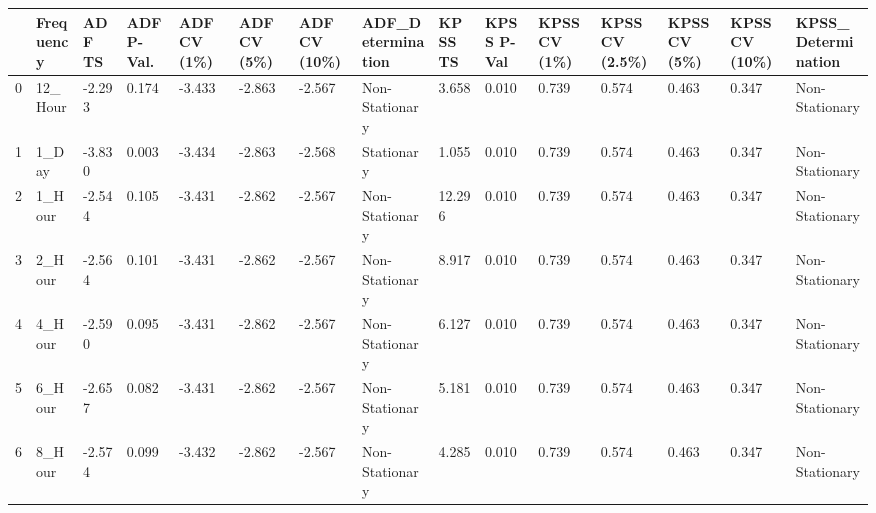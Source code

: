 \begin{tabular}{lllllllllllllll}
\toprule
 & Frequency & ADF TS & ADF P-Val. & ADF CV (1\%) & ADF CV (5\%) & ADF CV (10\%) & ADF_Determination & KPSS TS & KPSS P-Val & KPSS CV (1\%) & KPSS CV (2.5\%) & KPSS CV (5\%) & KPSS CV (10\%) & KPSS_Determination \\
\midrule
0 & 12_Hour & -2.293 & 0.174 & -3.433 & -2.863 & -2.567 & Non-Stationary & 3.658 & 0.010 & 0.739 & 0.574 & 0.463 & 0.347 & Non-Stationary \\
1 & 1_Day & -3.830 & 0.003 & -3.434 & -2.863 & -2.568 & Stationary & 1.055 & 0.010 & 0.739 & 0.574 & 0.463 & 0.347 & Non-Stationary \\
2 & 1_Hour & -2.544 & 0.105 & -3.431 & -2.862 & -2.567 & Non-Stationary & 12.296 & 0.010 & 0.739 & 0.574 & 0.463 & 0.347 & Non-Stationary \\
3 & 2_Hour & -2.564 & 0.101 & -3.431 & -2.862 & -2.567 & Non-Stationary & 8.917 & 0.010 & 0.739 & 0.574 & 0.463 & 0.347 & Non-Stationary \\
4 & 4_Hour & -2.590 & 0.095 & -3.431 & -2.862 & -2.567 & Non-Stationary & 6.127 & 0.010 & 0.739 & 0.574 & 0.463 & 0.347 & Non-Stationary \\
5 & 6_Hour & -2.657 & 0.082 & -3.431 & -2.862 & -2.567 & Non-Stationary & 5.181 & 0.010 & 0.739 & 0.574 & 0.463 & 0.347 & Non-Stationary \\
6 & 8_Hour & -2.574 & 0.099 & -3.432 & -2.862 & -2.567 & Non-Stationary & 4.285 & 0.010 & 0.739 & 0.574 & 0.463 & 0.347 & Non-Stationary \\
\bottomrule
\end{tabular}
